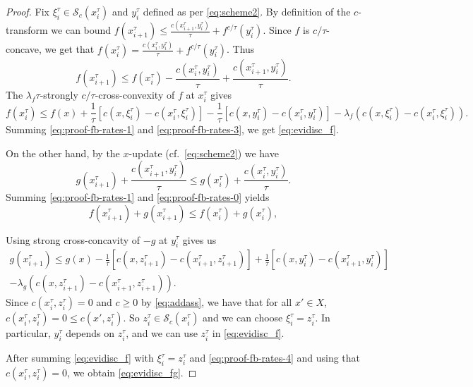 \documentclass[reqno]{amsart}
\theoremstyle{plain}
\theoremstyle{remark}
\theoremstyle{plain}
\numberwithin{equation}{section}
\theoremstyle{remark}
\begin{document}
\begin{proof}
    Fix $\xi_{i}^\tau\in \mathcal{S}_c(x_{i}^\tau)$ and $y^\tau_i$ defined as per \eqref{eq:scheme2}. By definition of the $c$-transform we can bound $f(x_{i+1}^\tau) \leq \frac{c(x_{i+1}^\tau,y_{i}^\tau)}{\tau}+f^{c/\tau}(y_{i}^\tau)$. Since $f$ is $c/\tau$-concave,  we get that   $f(x_{i}^\tau)=\frac{c(x_{i}^\tau,y_{i}^\tau)}{\tau}+f^{c/\tau}(y_{i}^\tau)$. Thus 
    \begin{equation}\label{eq:proof-fb-rates-1}
        f(x_{i+1}^\tau) \leq f(x_{i}^\tau)-\frac{c(x_{i}^\tau,y_{i}^\tau)}{\tau} + \frac{c(x_{i+1}^\tau,y_{i}^\tau)}{\tau}.
    \end{equation}
    The $\lambda_f \tau$-strongly $c/\tau$-cross-convexity of $f$ at $x_{i}^\tau$ gives
    \begin{equation}\label{eq:proof-fb-rates-3}
        f(x_{i}^\tau)\leq f(x)+\frac{1}{\tau} [c(x,\xi_{i}^\tau)-c(x_{i}^\tau,\xi_{i}^\tau)]-\frac{1}{\tau} [c(x,y_{i}^\tau)-c(x_{i}^\tau,y_{i}^\tau)]-\lambda_f (c(x,\xi_{i}^\tau)-c(x_{i}^\tau,\xi_{i}^\tau)).
    \end{equation}
    Summing \eqref{eq:proof-fb-rates-1} and \eqref{eq:proof-fb-rates-3}, we get \eqref{eq:evidisc_f}.
    
    On the other hand, by the $x$-update  (cf.~\eqref{eq:scheme2})  we have \begin{equation}\label{eq:proof-fb-rates-0}
        g(x_{i+1}^\tau) + \frac{c(x_{i+1}^\tau,y_{i}^\tau)}{\tau}\leq g(x_{i}^\tau)+ \frac{c(x_{i}^\tau,y_{i}^\tau)}{\tau}.
    \end{equation}
    Summing \eqref{eq:proof-fb-rates-1} and \eqref{eq:proof-fb-rates-0}  yields 
    \begin{equation}\label{eq:proof-fb-rates-2}
        f(x_{i+1}^\tau)+g(x_{i+1}^\tau)\leq f(x_{i}^\tau) +g(x_{i}^\tau),
    \end{equation}

    Using strong cross-concavity of $-g$ at $y_{i}^\tau$ gives us 
    \begin{multline}\label{eq:proof-fb-rates-4}
        g(x_{i+1}^\tau)\leq g(x)-\frac{1}{\tau}[c(x,z_{i+1}^\tau)-c(x_{i+1}^\tau,z_{i+1}^\tau)]+\frac{1}{\tau}[c(x,y_{i}^\tau)-c(x_{i+1}^\tau,y_{i}^\tau)]\\-\lambda_g(c(x,z_{i+1}^\tau)-c(x_{i+1}^\tau,z_{i+1}^\tau)).
    \end{multline}
    Since $c(x_{i}^\tau,z_{i}^\tau)=0$ and $c\ge 0$ by  \eqref{eq:addass},  we have that for all $x'\in X$, $c(x_{i}^\tau,z_{i}^\tau)=0\le c(x',z_{i}^\tau)$. So $z_{i}^\tau\in \mathcal{S}_c(x_{i}^\tau)$ and we can choose $\xi_{i}^\tau=z_{i}^\tau$.  In particular,   $y_{i}^\tau$ depends on $z_{i}^\tau$, and we can use $z_{i}^\tau$ in \eqref{eq:evidisc_f}.
    
    After summing \eqref{eq:evidisc_f} with $\xi_{i}^\tau=z_{i}^\tau$ and \eqref{eq:proof-fb-rates-4} and using that $c(x_{i}^\tau,z_{i}^\tau)=0$, we obtain \eqref{eq:evidisc_fg}.
\end{proof}
\end{document}
